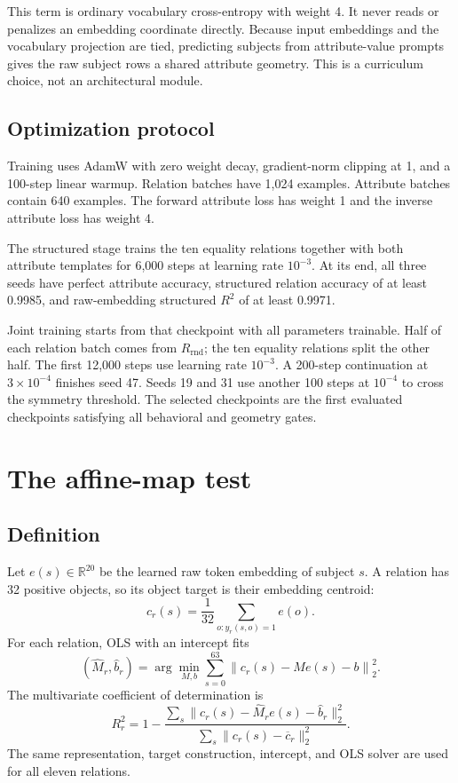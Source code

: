 \documentclass[11pt]{article}
\newcommand{\Rrnd}{R_{\mathrm{rnd}}}
\begin{document}
This term is ordinary vocabulary cross-entropy with weight 4.  It never reads
or penalizes an embedding coordinate directly.  Because input embeddings and
the vocabulary projection are tied, predicting subjects from attribute-value
prompts gives the raw subject rows a shared attribute geometry.  This is a
curriculum choice, not an architectural module.

\subsection{Optimization protocol}

Training uses AdamW with zero weight decay, gradient-norm clipping at 1, and a
100-step linear warmup.  Relation batches have 1,024 examples.  Attribute
batches contain 640 examples.  The forward attribute loss has weight 1 and the
inverse attribute loss has weight 4.

The structured stage trains the ten equality relations together with both
attribute templates for 6,000 steps at learning rate $10^{-3}$.  At its end,
all three seeds have perfect attribute accuracy, structured relation accuracy
of at least 0.9985, and raw-embedding structured $R^2$ of at least 0.9971.

Joint training starts from that checkpoint with all parameters trainable.  Half
of each relation batch comes from $\Rrnd$; the ten equality relations split the
other half.  The first 12,000 steps use learning rate $10^{-3}$.  A 200-step
continuation at $3\times10^{-4}$ finishes seed 47.  Seeds 19 and 31 use another
100 steps at $10^{-4}$ to cross the symmetry threshold.  The selected
checkpoints are the first evaluated checkpoints satisfying all behavioral and
geometry gates.

\section{The affine-map test}

\subsection{Definition}

Let $e(s)\in\mathbb R^{20}$ be the learned raw token embedding of subject $s$.
A relation has 32 positive objects, so its object target is their embedding
centroid:
\[
  c_r(s)=\frac{1}{32}\sum_{o:y_r(s,o)=1}e(o).
\]
For each relation, OLS with an intercept fits
\[
  (\widehat M_r,\widehat b_r)
  =\arg\min_{M,b}\sum_{s=0}^{63}
  \left\|c_r(s)-Me(s)-b\right\|_2^2.
\]
The multivariate coefficient of determination is
\[
  R_r^2=1-
  \frac{\sum_s\|c_r(s)-\widehat M_re(s)-\widehat b_r\|_2^2}
       {\sum_s\|c_r(s)-\overline c_r\|_2^2}.
\]
The same representation, target construction, intercept, and OLS solver are
used for all eleven relations.
\end{document}

